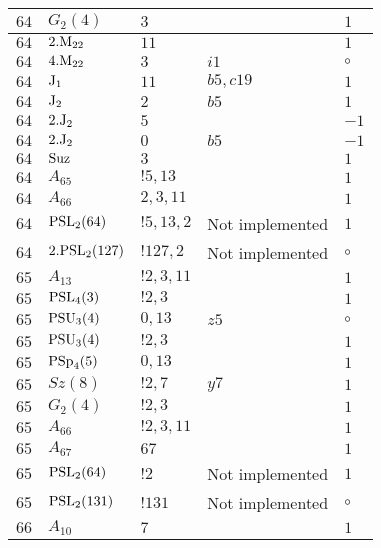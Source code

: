 \documentclass[a4paper, 11pt]{article}
\begin{document}
\begin{longtable}{lllll}
        $ 64 $ & $ G_{2}(4) $ & $ 3 $ & $ ~ $ & $ 1$ \\ \hline
        $ 64 $ & $ 2.{\rm M}_{22} $ & $ 11 $ & $ ~ $ & $ 1$ \\ \hline
        $ 64 $ & $ 4.{\rm M}_{22} $ & $ 3 $ & $ i1 $ &  $\circ$ \\ \hline
        $ 64 $ & $ {\rm J}_1 $ & $ 11 $ & $ b5, c19 $ & $ 1$ \\ \hline
        $ 64 $ & $ {\rm J}_2 $ & $ 2 $ & $ b5 $ & $ 1$ \\ \hline
        $ 64 $ & $ 2.{\rm J}_2 $ & $ 5 $ & $ ~ $ & $ -1$ \\ \hline
        $ 64 $ & $ 2.{\rm J}_2 $ & $ 0 $ & $ b5 $ & $ -1$ \\ \hline
        $ 64 $ & $ {\rm Suz} $ & $ 3 $ & $ ~ $ & $ 1$ \\ \hline
        $ 64 $ & $ A_{65} $ & $ !5, 13 $ & $ ~ $ & $ 1$ \\ \hline
        $ 64 $ & $ A_{66} $ & $ 2, 3, 11 $ & $ ~ $ & $ 1$ \\ \hline
        $ 64 $ & $ {\rm PSL}_{2}(64) $ & $ !5, 13, 2 $ &  Not implemented & $ 1$ \\ \hline
        $ 64 $ & $ 2.{\rm PSL}_{2}(127) $ & $ !127, 2 $ &  Not implemented &  $\circ$ \\ \hline
        $ 65 $ & $ A_{13} $ & $ ! 2,3,11 $ & $ ~ $ & $ 1$ \\ \hline
        $ 65 $ & $ {\rm PSL}_{4}(3) $ & $ ! 2,3 $ & $ ~ $ & $ 1$ \\ \hline
        $ 65 $ & $ {\rm PSU}_{3}(4) $ & $ 0,13 $ & $ z5 $ &  $\circ$ \\ \hline
        $ 65 $ & $ {\rm PSU}_{3}(4) $ & $ ! 2,3 $ & $ ~ $ & $ 1$ \\ \hline
        $ 65 $ & $ {\rm PSp}_{4}(5) $ & $ 0,13 $ & $ ~ $ & $ 1$ \\ \hline
        $ 65 $ & $ Sz(8) $ & $ ! 2,7 $ & $ y7 $ & $ 1$ \\ \hline
        $ 65 $ & $ G_{2}(4) $ & $ ! 2,3 $ & $ ~ $ & $ 1$ \\ \hline
        $ 65 $ & $ A_{66} $ & $ !2, 3, 11 $ & $ ~ $ & $ 1$ \\ \hline
        $ 65 $ & $ A_{67} $ & $ 67 $ & $ ~ $ & $ 1$ \\ \hline
        $ 65 $ & $ {\rm PSL}_{2}(64) $ & $ !2 $ &  Not implemented & $ 1$ \\ \hline
        $ 65 $ & $ {\rm PSL}_{2}(131) $ & $ !131 $ &  Not implemented &  $\circ$ \\ \hline
        $ 66 $ & $ A_{10} $ & $ 7 $ & $ ~ $ & $ 1$ \\ \hline

\end{longtable}
\end{document}
